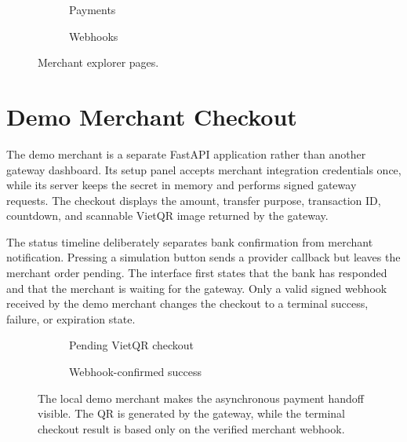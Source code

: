 \begin{figure}[!htbp]
\centering
\begin{subfigure}{0.48\textwidth}
  \centering
  \caption{Payments}
\end{subfigure}
\hfill
\begin{subfigure}{0.48\textwidth}
  \centering
  \caption{Webhooks}
\end{subfigure}
\caption{Merchant explorer pages.}
\end{figure}

\section{Demo Merchant Checkout}

The demo merchant is a separate FastAPI application rather than another
gateway dashboard. Its setup panel accepts merchant integration credentials
once, while its server keeps the secret in memory and performs signed gateway
requests. The checkout displays the amount, transfer purpose, transaction ID,
countdown, and scannable VietQR image returned by the gateway.

The status timeline deliberately separates bank confirmation from merchant
notification. Pressing a simulation button sends a provider callback but leaves
the merchant order pending. The interface first states that the bank has
responded and that the merchant is waiting for the gateway. Only a valid signed
webhook received by the demo merchant changes the checkout to a terminal
success, failure, or expiration state.

\begin{figure}[!htbp]
\centering
\begin{subfigure}[t]{0.48\textwidth}
  \centering
  \caption{Pending VietQR checkout}
\end{subfigure}
\hfill
\begin{subfigure}[t]{0.48\textwidth}
  \centering
  \caption{Webhook-confirmed success}
\end{subfigure}
\caption{The local demo merchant makes the asynchronous payment handoff visible.
The QR is generated by the gateway, while the terminal checkout result is based
only on the verified merchant webhook.}
\label{fig:demo-merchant-checkout}
\end{figure}

